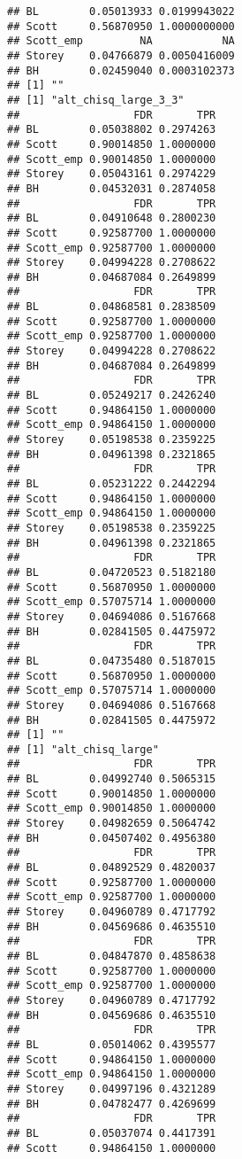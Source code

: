 \documentclass{article}\usepackage[]{graphicx}\usepackage[]{color}
\makeatletter
\newenvironment{kframe}{%
 \def\at@end@of@kframe{}%
 \ifinner\ifhmode%
  \def\at@end@of@kframe{\end{minipage}}%
  \begin{minipage}{\columnwidth}%
 \fi\fi%
 \def\FrameCommand##1{\hskip\@totalleftmargin \hskip-\fboxsep
 \colorbox{shadecolor}{##1}\hskip-\fboxsep
     \hskip-\linewidth \hskip-\@totalleftmargin \hskip\columnwidth}%
 \MakeFramed {\advance\hsize-\width
   \@totalleftmargin\z@ \linewidth\hsize
   \@setminipage}}%
 {\par\unskip\endMakeFramed%
 \at@end@of@kframe}
\newenvironment{knitrout}{}{} %
\makeatother
\begin{document}
\begin{knitrout}
\begin{kframe}
\begin{verbatim}
## BL        0.05013933 0.0199943022
## Scott     0.56870950 1.0000000000
## Scott_emp         NA           NA
## Storey    0.04766879 0.0050416009
## BH        0.02459040 0.0003102373
## [1] ""
## [1] "alt_chisq_large_3_3"
##                  FDR       TPR
## BL        0.05038802 0.2974263
## Scott     0.90014850 1.0000000
## Scott_emp 0.90014850 1.0000000
## Storey    0.05043161 0.2974229
## BH        0.04532031 0.2874058
##                  FDR       TPR
## BL        0.04910648 0.2800230
## Scott     0.92587700 1.0000000
## Scott_emp 0.92587700 1.0000000
## Storey    0.04994228 0.2708622
## BH        0.04687084 0.2649899
##                  FDR       TPR
## BL        0.04868581 0.2838509
## Scott     0.92587700 1.0000000
## Scott_emp 0.92587700 1.0000000
## Storey    0.04994228 0.2708622
## BH        0.04687084 0.2649899
##                  FDR       TPR
## BL        0.05249217 0.2426240
## Scott     0.94864150 1.0000000
## Scott_emp 0.94864150 1.0000000
## Storey    0.05198538 0.2359225
## BH        0.04961398 0.2321865
##                  FDR       TPR
## BL        0.05231222 0.2442294
## Scott     0.94864150 1.0000000
## Scott_emp 0.94864150 1.0000000
## Storey    0.05198538 0.2359225
## BH        0.04961398 0.2321865
##                  FDR       TPR
## BL        0.04720523 0.5182180
## Scott     0.56870950 1.0000000
## Scott_emp 0.57075714 1.0000000
## Storey    0.04694086 0.5167668
## BH        0.02841505 0.4475972
##                  FDR       TPR
## BL        0.04735480 0.5187015
## Scott     0.56870950 1.0000000
## Scott_emp 0.57075714 1.0000000
## Storey    0.04694086 0.5167668
## BH        0.02841505 0.4475972
## [1] ""
## [1] "alt_chisq_large"
##                  FDR       TPR
## BL        0.04992740 0.5065315
## Scott     0.90014850 1.0000000
## Scott_emp 0.90014850 1.0000000
## Storey    0.04982659 0.5064742
## BH        0.04507402 0.4956380
##                  FDR       TPR
## BL        0.04892529 0.4820037
## Scott     0.92587700 1.0000000
## Scott_emp 0.92587700 1.0000000
## Storey    0.04960789 0.4717792
## BH        0.04569686 0.4635510
##                  FDR       TPR
## BL        0.04847870 0.4858638
## Scott     0.92587700 1.0000000
## Scott_emp 0.92587700 1.0000000
## Storey    0.04960789 0.4717792
## BH        0.04569686 0.4635510
##                  FDR       TPR
## BL        0.05014062 0.4395577
## Scott     0.94864150 1.0000000
## Scott_emp 0.94864150 1.0000000
## Storey    0.04997196 0.4321289
## BH        0.04782477 0.4269699
##                  FDR       TPR
## BL        0.05037074 0.4417391
## Scott     0.94864150 1.0000000

\end{verbatim}
\end{kframe}
\end{knitrout}
\end{document}
